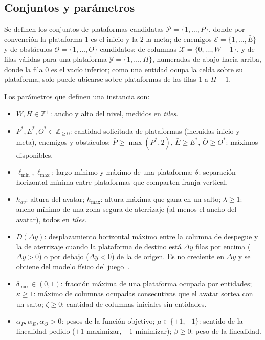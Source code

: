 \documentclass[letter, 10pt]{article}
\begin{document}
\subsection{Conjuntos y par\'ametros}

Se definen los conjuntos de plataformas candidatas $\mathcal{P} = \{1,\dots,\bar{P}\}$, donde por convenci\'on la plataforma $1$ es el inicio y la $2$ la meta; de enemigos $\mathcal{E} = \{1,\dots,\bar{E}\}$ y de obst\'aculos $\mathcal{O} = \{1,\dots,\bar{O}\}$ candidatos; de columnas $\mathcal{X} = \{0,\dots,W-1\}$, y de filas v\'alidas para una plataforma $\mathcal{Y} = \{1,\dots,H\}$, numeradas de abajo hacia arriba, donde la fila $0$ es el vac\'io inferior; como una entidad ocupa la celda sobre su plataforma, solo puede ubicarse sobre plataformas de las filas $1$ a $H-1$.

Los par\'ametros que definen una instancia son:
\begin{itemize}\setlength{\itemsep}{0pt}\setlength{\parskip}{0pt}
\item $W, H \in \mathbb{Z}^+$: ancho y alto del nivel, medidos en \emph{tiles}.
\item $P^*, E^*, O^* \in \mathbb{Z}_{\geq 0}$: cantidad solicitada de plataformas (incluidas inicio y meta), enemigos y obst\'aculos; $\bar{P} \geq \max(P^*, 2)$, $\bar{E} \geq E^*$, $\bar{O} \geq O^*$: m\'aximos disponibles.
\item $\ell_{\min}, \ell_{\max}$: largo m\'inimo y m\'aximo de una plataforma; $\theta$: separaci\'on horizontal m\'inima entre plataformas que comparten franja vertical.
\item $h_{av}$: altura del avatar; $h_{\max}$: altura m\'axima que gana en un salto; $\lambda \geq 1$: ancho m\'inimo de una zona segura de aterrizaje (al menos el ancho del avatar), todos en \emph{tiles}.
\item $D(\Delta y)$: desplazamiento horizontal m\'aximo entre la columna de despegue y la de aterrizaje cuando la plataforma de destino est\'a $\Delta y$ filas por encima ($\Delta y > 0$) o por debajo ($\Delta y < 0$) de la de origen. Es no creciente en $\Delta y$ y se obtiene del modelo f\'isico del juego~\cite{Compton2006, DePontes2022}.
\item $\delta_{\max} \in (0,1)$: fracci\'on m\'axima de una plataforma ocupada por entidades; $\kappa \geq 1$: m\'aximo de columnas ocupadas consecutivas que el avatar sortea con un salto; $\zeta \geq 0$: cantidad de columnas iniciales sin entidades.
\item $\alpha_P, \alpha_E, \alpha_O > 0$: pesos de la funci\'on objetivo; $\mu \in \{+1,-1\}$: sentido de la linealidad pedido ($+1$ maximizar, $-1$ minimizar); $\beta \geq 0$: peso de la linealidad.
\end{itemize}
\end{document}

